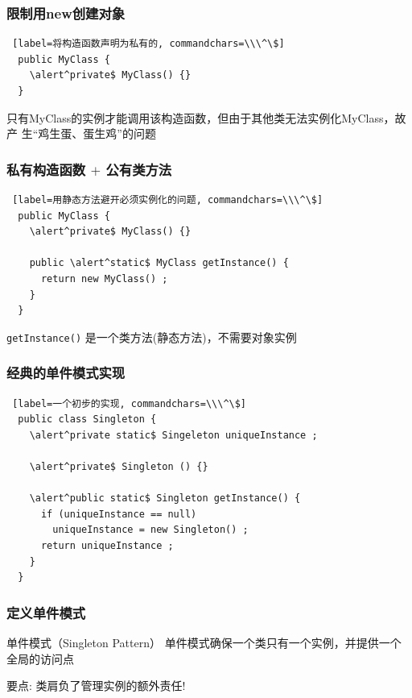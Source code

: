 \documentclass[compress]{beamer}
\begin{document}
\begin{frame}[fragile]
  \frametitle{限制用new创建对象}
\begin{Verbatim} [label=将构造函数声明为私有的, commandchars=\\\^\$]
  public MyClass {
    \alert^private$ MyClass() {}
  }
\end{Verbatim}
\vspace*{3ex}
只有MyClass的实例才能调用该构造函数，但由于其他类无法实例化MyClass，故产
生``鸡生蛋、蛋生鸡''的问题
\end{frame}

\begin{frame}[fragile]
  \frametitle{私有构造函数 $+$ 公有类方法}
\begin{Verbatim} [label=用静态方法避开必须实例化的问题, commandchars=\\\^\$]
  public MyClass {
    \alert^private$ MyClass() {}

    public \alert^static$ MyClass getInstance() {
      return new MyClass() ;
    }
  }
\end{Verbatim}
\vspace*{2ex}
\verb~getInstance()~ 是一个类方法(静态方法)，不需要对象实例
\end{frame}

\begin{frame}[fragile]
  \frametitle{经典的单件模式实现}
\begin{Verbatim} [label=一个初步的实现, commandchars=\\\^\$]
  public class Singleton {
    \alert^private static$ Singeleton uniqueInstance ;

    \alert^private$ Singleton () {} 

    \alert^public static$ Singleton getInstance() {
      if (uniqueInstance == null) 
        uniqueInstance = new Singleton() ;
      return uniqueInstance ;
    }
  }
\end{Verbatim}
\end{frame}

\begin{frame}
  \frametitle{定义单件模式}
  \begin{block}{单件模式（Singleton Pattern）}
    单件模式确保一个类只有一个实例，并提供一个全局的访问点
  \end{block}

  要点: 类肩负了管理实例的额外责任! \\[2ex]

  \qquad{}

\end{frame}
\end{document}
